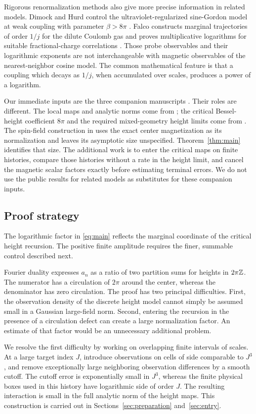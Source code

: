 Rigorous renormalization methods also give more precise information
in related models. Dimock and Hurd control the ultraviolet-regularized
sine-Gordon model at weak coupling with parameter \(\beta>8\pi\)
\cite{DimockHurd2000}.
Falco constructs marginal trajectories of order \(1/j\) for the
dilute Coulomb gas and proves multiplicative logarithms for suitable
fractional-charge correlations \cite{Falco2012,Falco2013}.
Those probe observables and their logarithmic exponents are not
interchangeable with magnetic observables of the nearest-neighbor
cosine model. The common mathematical feature is that a coupling
which decays as \(1/j\), when accumulated over scales, produces a
power of a logarithm.

Our immediate inputs are the three companion manuscripts
\cite{B,X,S}. Their roles are different. The local maps and analytic
norms come from \cite{B}; the critical Bessel-height coefficient
\(8\pi\) and the required mixed-geometry height limits come from
\cite{X}. The spin-field construction in \cite{S} uses the exact
center magnetization as its normalization and leaves its asymptotic
size unspecified. Theorem~\ref{thm:main} identifies that size. The
additional work is to enter the critical maps on finite histories,
compare those histories without a rate in the height limit, and
cancel the magnetic scalar factors exactly before estimating terminal
errors. We do not use the public results for related models as
substitutes for these companion inputs.

\subsection{Proof strategy}

The logarithmic factor in \eqref{eq:main} reflects the marginal
coordinate of the critical height recursion. The positive finite
amplitude requires the finer, summable control described next.

Fourier duality expresses \(a_n\) as a ratio of two partition sums for
heights in \(2\pi\mathbb Z\). The numerator has a circulation of \(2\pi\)
around the center, whereas the denominator has zero circulation.
The proof has two principal difficulties. First, the observation density
of the discrete height model cannot simply be assumed small in a
Gaussian large-field norm. Second, entering the recursion in the presence
of a circulation defect can create a large normalization factor. An
estimate of that factor would be an unnecessary additional problem.

We resolve the first difficulty by working on overlapping finite intervals
of scales. At a large target index \(J\), introduce observations on cells
of side comparable to \(J^3\), and remove exceptionally large neighboring
observation differences by a smooth cutoff. The cutoff error is
exponentially small in \(J^3\), whereas the finite physical boxes used in
this history have logarithmic side of order \(J\). The resulting
interaction is small in the full analytic norm of the height maps.
This construction is carried out in Sections~\ref{sec:preparation}
and~\ref{sec:entry}.

